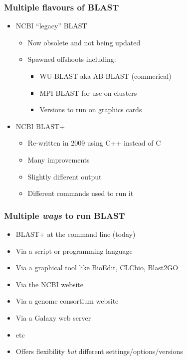 \documentclass[table]{beamer}
\begin{document}
    \begin{frame}
     \frametitle{Multiple flavours of BLAST}
     \begin{itemize}
       \item NCBI ``legacy'' BLAST
       \begin{itemize}
           \item Now obsolete and not being updated
           \item Spawned offshoots including:
           \begin{itemize}
               \item WU-BLAST aka AB-BLAST (commerical)
               \item MPI-BLAST for use on clusters
               \item Versions to run on graphics cards
           \end{itemize}
       \end{itemize}
       \item NCBI BLAST+
       \begin{itemize}
           \item Re-written in 2009 using C++ instead of C
           \item Many improvements
           \item Slightly different output
           \item Different commands used to run it
       \end{itemize}
     \end{itemize}
    \end{frame}

    \begin{frame}
     \frametitle{Multiple \textit{ways} to run BLAST}
     \begin{itemize}
       \item BLAST+ at the command line (today)
       \item Via a script or programming language
       \item Via a graphical tool like BioEdit, CLCbio, Blast2GO
       \item Via the NCBI website
       \item Via a genome consortium website
       \item Via a Galaxy web server
       \item etc
       \item Offers flexibility \textit{but} different settings/options/versions
     \end{itemize}
    \end{frame}
\end{document}

